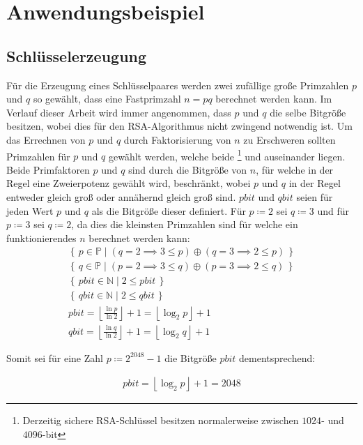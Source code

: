 \chapter{Anwendungsbeispiel}

\section{Schlüsselerzeugung}

Für die Erzeugung eines Schlüsselpaares werden zwei zufällige große Primzahlen $p$ und $q$ so gewählt, dass eine Fastprimzahl $n=pq$ berechnet werden kann. Im Verlauf dieser Arbeit wird immer angenommen, dass $p$ und $q$ die selbe Bitgröße besitzen, wobei dies für den RSA-Algorithmus nicht zwingend notwendig ist.
Um das Errechnen von $p$ und $q$ durch Faktorisierung von $n$ zu Erschweren sollten Primzahlen für $p$ und $q$ gewählt werden, welche beide \footnote{Derzeitig sichere RSA-Schlüssel besitzen normalerweise zwischen $1024$- und $4096$-bit} und  auseinander liegen.
Beide Primfaktoren $p$ und $q$ sind durch die Bitgröße von $n$, für welche in der Regel eine Zweierpotenz gewählt wird, beschränkt, wobei $p$ und $q$ in der Regel entweder gleich groß oder annähernd gleich groß sind. $pbit$ und $qbit$ seien für jeden Wert $p$ und $q$ als die Bitgröße dieser definiert.
Für $p\coloneq2$ sei $q\coloneq3$ und für $p\coloneq3$ sei $q\coloneq2$, da dies die kleinsten Primzahlen sind für welche ein funktionierendes $n$ berechnet werden kann:
\begin{align}
  \left\{\,p \in \mathbb{P}\mid (q=2 \implies 3 \le p) \oplus (q=3 \implies 2 \le p)\, \right\}\\
  \left\{\,q \in \mathbb{P}\mid (p=2 \implies 3 \le q) \oplus (p=3 \implies 2 \le q)\, \right\}\\
  \left\{\,pbit \in \mathbb{N}\mid 2 \le pbit\, \right\}\\
  \left\{\,qbit \in \mathbb{N}\mid 2 \le qbit\, \right\}\\
  pbit=\left\lfloor\frac{\ln{p}}{\ln{2}}\right\rfloor+1=\left\lfloor\log_2{p}\right\rfloor+1\\
  qbit=\left\lfloor\frac{\ln{q}}{\ln{2}}\right\rfloor+1=\left\lfloor\log_2{q}\right\rfloor+1
\end{align}

Somit sei für eine Zahl $p\coloneq2^{2048}-1$ die Bitgröße $pbit$ dementsprechend:

\begin{align}
  pbit=\left\lfloor\log_2{p}\right\rfloor+1=2048
\end{align}

